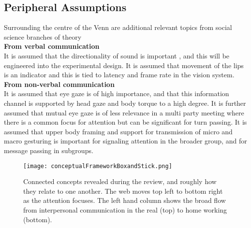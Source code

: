             \subsection{Peripheral Assumptions}
                Surrounding the centre of the Venn are additional relevant topics from social science branches of theory\\
                \textbf{From verbal communication}\\
                It is assumed that the directionality of sound is important \cite{Aoki2003}, and this will be engineered into the experimental design. It is assumed that movement of the lips is an indicator and this is tied to latency and frame rate in the vision system.\\
                \textbf{From non-verbal communication}\\
                It is assumed that eye gaze is of high importance, and that this information channel is supported by head gaze and body torque to a high degree. It is further assumed that mutual eye gaze is of less relevance in a multi party meeting where there is a common focus for attention but can be significant for turn passing.
                It is assumed that upper body framing and support for transmission of micro and macro gesturing is important for signaling attention in the broader group, and for message passing in subgroups.
                
                        \begin{figure}[h!] \texttt{[image: conceptualFrameworkBoxandStick.png]} \caption{Connected concepts revealed during the review, and roughly how they relate to one another. The web moves top left to bottom right as the attention focuses. The left hand column shows the broad flow from interpersonal communication in the real (top) to home working (bottom).} \label{fig:conceptualFramework} \end{figure}
